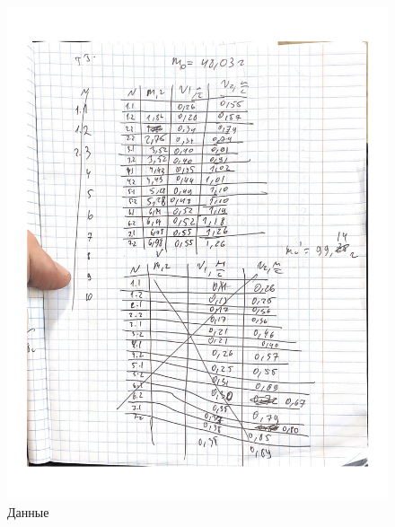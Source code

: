 \documentclass[a4paper]{article}
\begin{document}
\begin{figure}[H]
\includegraphics[width=\textwidth, scale=0.5]{1-3.png}
\caption{Данные}
\end{figure}
\end{document}
